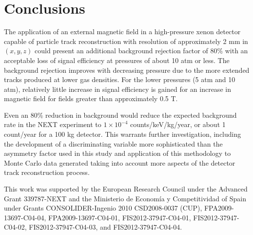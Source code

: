 \documentclass{JINST}
\begin{document}
\section{Conclusions}
The application of an external magnetic field in a high-pressure xenon detector capable of particle track reconstruction with resolution of approximately 2 mm in $(x,y,z)$ could present an additional background rejection factor of 80\% with an acceptable loss of signal efficiency at pressures of about 10 atm or less.  The background rejection improves with decreasing pressure due to the more extended tracks produced at lower gas densities.  For the lower pressures (5 atm and 10 atm), relatively little increase in signal efficiency is gained for an increase in magnetic field for fields greater than approximately 0.5 T.

Even an 80\% reduction in background would reduce the expected background rate in the NEXT experiment to
$1 \times 10^{-4}$ counts/keV/kg/year, or about 1 count/year for a 100 kg detector.  This warrants further
investigation, including the development of a discriminating variable more sophisticated than the asymmetry 
factor used in this study and application of this methodology to Monte Carlo data generated taking into account 
more aspects of the detector track reconstruction process.

\acknowledgments

This work was supported by the European Research Council under the Advanced Grant 339787-NEXT and the Ministerio de Econom\'{i}a y Competitividad of Spain under Grants CONSOLIDER-Ingenio 2010 CSD2008-0037 (CUP), FPA2009-13697-C04-04, FPA2009-13697-C04-01, FIS2012-37947-C04-01, FIS2012-37947-C04-02, FIS2012-37947-C04-03, and FIS2012-37947-C04-04.



\end{document}
